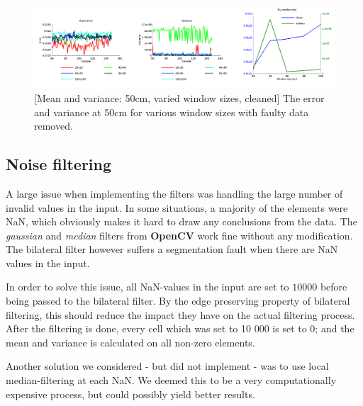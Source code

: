 \documentclass[11pt]{article}
\begin{document}
\begin{figure}[ht]
  \centering
  \includegraphics[width=1\textwidth]{figures/plot2bywindowsize.png}
  [Mean and variance: 50cm, varied window sizes, cleaned]{\label{fig:variedwindow2} The error and variance at 50cm for various window sizes with faulty data removed.}
\end{figure}

\subsection{Noise filtering}
A large issue when implementing the filters was handling the large number of invalid values in the input. In some situations, a majority of the elements were NaN, which obviously makes it hard to draw any conclusions from the data. The \emph{gaussian} and \emph{median} filters from \textbf{OpenCV} work fine  without any modification. The bilateral filter however suffers a segmentation fault when there are NaN values in the input. \par

In order to solve this issue, all NaN-values in the input are set to $10000$ before being passed to the bilateral filter. By the edge preserving property of bilateral filtering, this should reduce the impact they have on the actual filtering process. After the filtering is done, every cell which was set to 10 000 is set to 0; and the mean and variance is calculated on all non-zero elements. \par
Another solution we considered - but did not implement - was to use local median-filtering at each NaN. We deemed this to be a very computationally expensive process, but could possibly yield better results. \par
\end{document}
